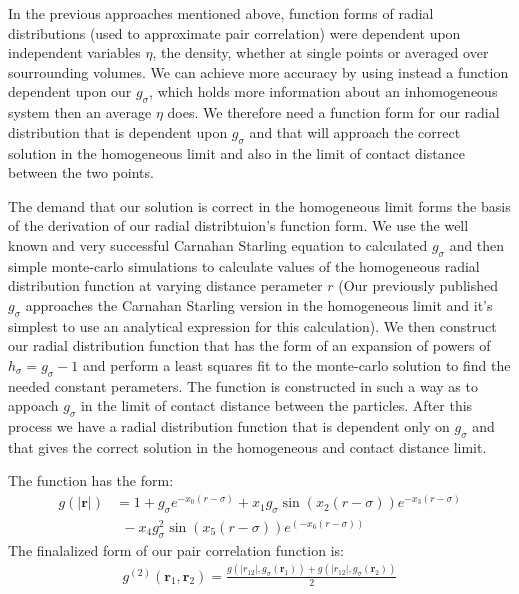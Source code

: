 \documentclass[letterpaper,twocolumn,amsmath,amssymb,pre,aps,10pt]{revtex4-1}
\newcommand{\rr}{\textbf{r}}
\begin{document}
In the previous approaches mentioned above, function forms of radial
distributions (used to approximate pair correlation) were dependent
upon independent variables $\eta$, the density, whether at single
points or averaged over sourrounding volumes.  We can achieve more
accuracy by using instead a function dependent upon our $g_{\sigma}$,
which holds more information about an inhomogeneous system
then an average $\eta$ does.  We therefore need a function form for
our radial distribution that is dependent upon $g_{\sigma}$ and that
will approach the correct solution in the homogeneous limit and also
in the limit of contact distance between the two points.

The demand that our solution is correct in the homogeneous limit forms
the basis of the derivation of our radial distribtuion's function
form. We use the well known and very successful Carnahan Starling
equation to calculated $g_{\sigma}$ and then simple monte-carlo
simulations to calculate values of the homogeneous radial distribution
function at varying distance perameter $r$ (Our previously published
$g_{\sigma}$ approaches the Carnahan Starling version in the
homogeneous limit and it's simplest to use an analytical expression
for this calculation).  We then construct our radial distribution
function that has the form of an expansion of powers of $h_{\sigma} =
g_{\sigma}-1$ and perform a least squares fit to the monte-carlo
solution to find the needed constant perameters.  The function is
constructed in such a way as to appoach $g_{\sigma}$ in the limit of
contact distance between the particles.  After this process we have a
radial distribution function that is dependent only on $g_{\sigma}$
and that gives the correct solution in the homogeneous and contact
distance limit.

The function has the form:
\begin{align}
  g(|\rr|) &= 1 + g_{\sigma}e^{-x_0(r-\sigma)} + x_1g_{\sigma}\sin(x_2(r-\sigma))e^{-x_3(r-\sigma)}\\
  &~~-x_4g_{\sigma}^2\sin(x_5(r-\sigma))e^(-x_6(r-\sigma))
\end{align}
The finalalized form of our pair correlation function is:
\begin{align}
  g^{(2)}(\rr_1,\rr_2) = \frac{g(|r_{12}|, g_\sigma(\rr_1)) + g(|r_{12}|, g_\sigma(\rr_2))}{2}
\end{align}



\end{document}

